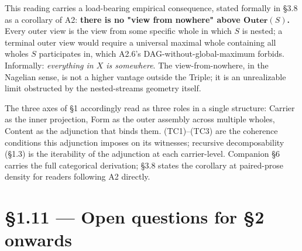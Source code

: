 \documentclass[11pt, openany]{book}
\newcommand{\sectionbreak}{\clearpage}
\begin{document}
This reading carries a load-bearing empirical consequence, stated formally in §3.8 as a corollary of A2: \textbf{there is no "view from nowhere" above $\mathbf{Outer}(S)$.} Every outer view is the view from some specific whole in which $S$ is nested; a terminal outer view would require a universal maximal whole containing all wholes $S$ participates in, which A2.6's DAG-without-global-maximum forbids. Informally: \textit{everything in $X$ is somewhere}. The view-from-nowhere, in the Nagelian sense, is not a higher vantage outside the Triple; it is an unrealizable limit obstructed by the nested-streams geometry itself.

The three axes of §1 accordingly read as three roles in a single structure: Carrier as the inner projection, Form as the outer assembly across multiple wholes, Content as the adjunction that binds them. (TC1)–(TC3) are the coherence conditions this adjunction imposes on its witnesses; recursive decomposability (§1.3) is the iterability of the adjunction at each carrier-level. Companion §6 carries the full categorical derivation; §3.8 states the corollary at paired-prose density for readers following A2 directly.

\sectionbreak

\section{§1.11 --- Open questions for §2 onwards}
\end{document}
